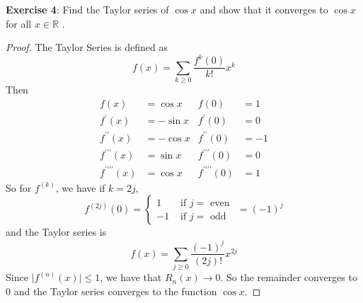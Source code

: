 \documentclass{article}
\begin{document}
\textbf{Exercise 4}: Find the Taylor series of $\cos{x}$ and show that it converges to $\cos{x}$ for all $x \in \mathbb{ R}$ .
    \begin{proof}
        The Taylor Series is defined as
            \begin{equation*}
                f(x) = \sum_{k \geq 0}\dfrac{f^{k}(0)}{k!}x^{k}
            \end{equation*}
        Then
            \begin{align*}
                f(x)                            &= \cos{x}  & f(0)                         &= 1  \\
                f^{\prime}(x)                   &= -\sin{x} & f^{\prime}(0)                &= 0  \\
                f^{\prime\prime}(x)             &= -\cos{x} & f^{\prime\prime}(0)          &= -1 \\
                f^{\prime\prime\prime}(x)       &= \sin{x}  & f^{\prime\prime\prime}(0)    &= 0  \\
                f^{\prime\prime\prime\prime}(x) &= \cos{x}  & f^{\prime\prime\prime\prime}(0) &= 1    
            \end{align*}
        So for $f^{(k)}$, we have if $k = 2j$,
            \begin{equation*}
                f^{(2j)}(0) = \begin{cases}
                    1 &\text{ if } j = \text{ even } \\
                    -1 &\text{ if } j = \text{ odd }   
                \end{cases} = (-1)^{j}
            \end{equation*}
        and the Taylor series is
            \begin{equation*}
                f(x) = \sum_{j \geq0}\dfrac{(-1)^{j}}{(2j)!}x^{2j}
            \end{equation*}
        Since $\lvert f^{(n)}(x) \rvert \leq 1$, we have that $R_{n}(x) \rightarrow 0$. So the remainder converges to $0$ and the Taylor series converges to the function $\cos{x}$.
    \end{proof}
\end{document}
